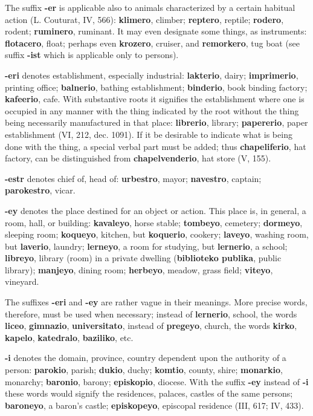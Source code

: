 The suffix \textbf{-er} is applicable also to animals characterized by a certain habitual action (L. Couturat, IV, 566): \textbf{klimero}, climber; \textbf{reptero}, reptile; \textbf{rodero}, rodent; \textbf{ruminero}, ruminant. It may even designate some things, as instruments: \textbf{flotacero}, float; perhaps even \textbf{krozero}, cruiser, and \textbf{remorkero}, tug boat (see suffix \textbf{-ist} which is applicable only to persons). 

\textbf{-eri} denotes establishment, especially industrial: \textbf{lakterio}, dairy; \textbf{imprimerio}, printing office; \textbf{balnerio}, bathing establishment; \textbf{binderio}, book binding factory; \textbf{kafeerio}, cafe. With substantive roots it signifies the establishment where one is occupied in any manner with the thing indicated by the root without the thing being necessarily manufactured in that place: \textbf{librerio}, library; \textbf{papererio}, paper establishment (VI, 212, dec. 1091). If it be desirable to indicate what is being done with the thing, a special verbal part must be added; thus \textbf{chapeliferio}, hat factory, can be distinguished from \textbf{chapelvenderio}, hat store (V, 155). 

\textbf{-estr} denotes chief of, head of: \textbf{urbestro}, mayor; \textbf{navestro}, captain; \textbf{parokestro}, vicar. 

\textbf{-ey} denotes the place destined for an object or action. This place is, in general, a room, hall, or building: \textbf{kavaleyo}, horse stable; \textbf{tombeyo}, cemetery; \textbf{dormeyo}, sleeping room; \textbf{koqueyo}, kitchen, but \textbf{koquerio}, cookery; \textbf{laveyo}, washing room, but \textbf{laverio}, laundry; \textbf{lerneyo}, a room for studying, but \textbf{lernerio}, a school; \textbf{libreyo}, library (room) in a private dwelling (\textbf{biblioteko publika}, public library); \textbf{manjeyo}, dining room; \textbf{herbeyo}, meadow, grass field; \textbf{viteyo}, vineyard. 

The suffixes \textbf{-eri} and \textbf{-ey} are rather vague in their meanings. More precise words, therefore, must be used when necessary; instead of \textbf{lernerio}, school, the words \textbf{liceo}, \textbf{gimnazio}, \textbf{universitato}, instead of \textbf{pregeyo}, church, the words \textbf{kirko}, \textbf{kapelo}, \textbf{katedralo}, \textbf{baziliko}, etc. 

\textbf{-i} denotes the domain, province, country dependent upon the authority of a person: \textbf{parokio}, parish; \textbf{dukio}, duchy; \textbf{komtio}, county, shire; \textbf{monarkio}, monarchy; \textbf{baronio}, barony; \textbf{episkopio}, diocese. With the suffix \textbf{-ey} instead of \textbf{-i} these words would signify the residences, palaces, castles of the same persons; \textbf{baroneyo}, a baron's castle; \textbf{episkopeyo}, episcopal residence (III, 617; IV, 433). 

